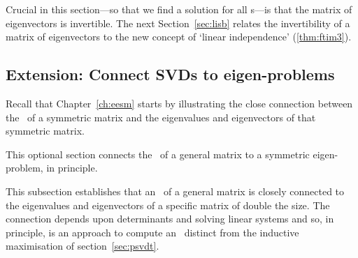 Crucial in this section---so that we find a solution for all s---is that the matrix of eigenvectors is invertible.
The next Section~\ref{sec:lisb} relates the invertibility of a matrix of eigenvectors to the new concept of `linear independence' (\autoref{thm:ftim3}).
















\subsection{Extension: Connect SVDs to eigen-problems}

Recall that Chapter~\ref{ch:eesm} starts by illustrating the close connection between the \svd\ of a symmetric matrix and the eigenvalues and eigenvectors of that symmetric matrix.
\begin{aside}
This optional section connects the \svd\ of a general matrix to a symmetric eigen-problem, in principle.
\end{aside}%
This subsection establishes that an \svd\ of a general matrix is closely connected to the eigenvalues and eigenvectors of a specific matrix of double the size.   
The connection depends upon determinants and solving linear systems and so, in principle, is an approach to compute an \svd\ distinct from the inductive maximisation of section~\ref{sec:psvdt}.



